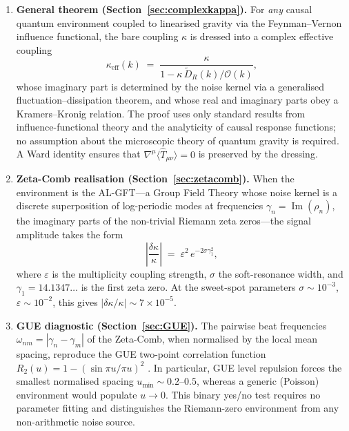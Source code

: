 \documentclass[12pt,a4paper]{article}
\begin{document}
\begin{enumerate}
\item \textbf{General theorem (Section~\ref{sec:complexkappa}).}
  For \emph{any} causal quantum environment coupled to linearised gravity via the Feynman--Vernon influence functional, the bare coupling $\kappa$ is dressed into a complex effective coupling
  \begin{equation}\label{eq:keff_intro}
    \kappa_{\mathrm{eff}}(k) \;=\; \frac{\kappa}{1 - \kappa\,\tilde{D}_{R}(k)\big/\mathcal{O}(k)},
  \end{equation}
  whose imaginary part is determined by the noise kernel via a generalised fluctuation--dissipation theorem, and whose real and imaginary parts obey a Kramers--Kronig relation.
  The proof uses only standard results from influence-functional theory and the analyticity of causal response functions; no assumption about the microscopic theory of quantum gravity is required.
  A Ward identity ensures that $\nabla^{\mu}\langle\hat{T}_{\mu\nu}\rangle=0$ is preserved by the dressing.

\item \textbf{Zeta-Comb realisation (Section~\ref{sec:zetacomb}).}
  When the environment is the AL-GFT---a Group Field Theory whose noise kernel is a discrete superposition of log-periodic modes at frequencies $\gamma_{n}=\operatorname{Im}(\rho_{n})$, the imaginary parts of the non-trivial Riemann zeta zeros---the signal amplitude takes the form
  \begin{equation}\label{eq:signal_intro}
    \left|\frac{\delta\kappa}{\kappa}\right| \;=\; \varepsilon^{2}\,e^{-2\sigma\gamma_{1}^{2}},
  \end{equation}
  where $\varepsilon$ is the multiplicity coupling strength, $\sigma$ the soft-resonance width, and $\gamma_{1}=14.1347\ldots$ is the first zeta zero.
  At the sweet-spot parameters $\sigma\sim 10^{-3}$, $\varepsilon\sim 10^{-2}$, this gives $|\delta\kappa/\kappa|\sim 7\times 10^{-5}$.

\item \textbf{GUE diagnostic (Section~\ref{sec:GUE}).}
  The pairwise beat frequencies $\omega_{nm}=|\gamma_{n}-\gamma_{m}|$ of the Zeta-Comb, when normalised by the local mean spacing, reproduce the GUE two-point correlation function $R_{2}(u)=1-(\sin\pi u/\pi u)^{2}$ \cite{MontgomeryWiki}.
  In particular, GUE level repulsion forces the smallest normalised spacing $u_{\min}\sim 0.2$--$0.5$, whereas a generic (Poisson) environment would populate $u\to 0$.
  This binary yes/no test requires no parameter fitting and distinguishes the Riemann-zero environment from any non-arithmetic noise source.


\end{enumerate}
\end{document}
